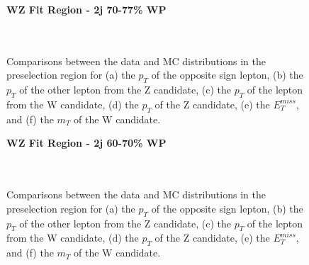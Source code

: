 \begin{figure}[H] 
    \centering
    \textbf{WZ Fit Region - 2j 70-77\% WP}\\
    \\
    \\
    \caption{Comparisons between the data and MC distributions in the preselection region for (a) the $p_T$ of the opposite sign lepton, (b) the $p_T$ of the other lepton from the Z candidate, (c) the $p_T$ of the lepton from the W candidate, (d) the $p_T$ of the Z candidate, (e) the $E_T^{miss}$, and (f) the $m_T$ of the W candidate.}
    \label{kin:WP_2j_70_77}
\end{figure}

\begin{figure}[H] 
    \centering
    \textbf{WZ Fit Region - 2j 60-70\% WP}\\
    \\
    \\
    \caption{Comparisons between the data and MC distributions in the preselection region for (a) the $p_T$ of the opposite sign lepton, (b) the $p_T$ of the other lepton from the Z candidate, (c) the $p_T$ of the lepton from the W candidate, (d) the $p_T$ of the Z candidate, (e) the $E_T^{miss}$, and (f) the $m_T$ of the W candidate.}
    \label{kin:WP_2j_60_70}
\end{figure}

